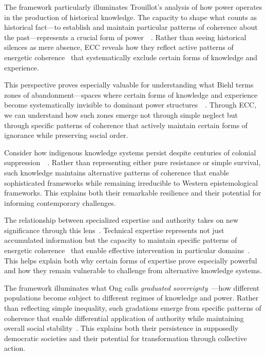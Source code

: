 The framework particularly illuminates Trouillot's analysis of how power operates in the production of historical knowledge. The capacity to shape what counts as historical fact—to establish and maintain particular patterns of coherence about the past—represents a crucial form of power~~\cite{strathern2004partial}. Rather than seeing historical silences as mere absence, ECC reveals how they reflect active patterns of energetic coherence~ that systematically exclude certain forms of knowledge and experience.

This perspective proves especially valuable for understanding what Biehl terms zones of abandonment—spaces where certain forms of knowledge and experience become systematically invisible to dominant power structures~~\cite{tsing2015mushroom}. Through ECC, we can understand how such zones emerge not through simple neglect but through specific patterns of coherence that actively maintain certain forms of ignorance while preserving social order.

Consider how indigenous knowledge systems persist despite centuries of colonial suppression~~\cite{povinelli2002cunning,nadasdy2007gift}. Rather than representing either pure resistance or simple survival, such knowledge maintains alternative patterns of coherence that enable sophisticated frameworks while remaining irreducible to Western epistemological frameworks. This explains both their remarkable resilience and their potential for informing contemporary challenges.

The relationship between specialized expertise and authority takes on new significance through this lens~\cite{latour1987science}. Technical expertise represents not just accumulated information but the capacity to maintain specific patterns of energetic coherence~ that enable effective intervention in particular domains~\cite{marchand2010making}. This helps explain both why certain forms of expertise prove especially powerful and how they remain vulnerable to challenge from alternative knowledge systems.

The framework illuminates what Ong calls \textit{graduated sovereignty}~\cite{ong2006neoliberalism}—how different populations become subject to different regimes of knowledge and power. Rather than reflecting simple inequality, such gradations emerge from specific patterns of coherence that enable differential application of authority while maintaining overall social stability~\cite{appadurai1996modernity}. This explains both their persistence in supposedly democratic societies and their potential for transformation through collective action.

